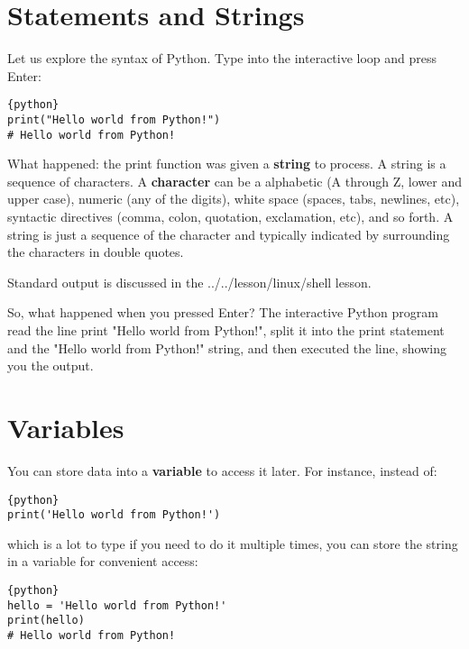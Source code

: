 \FILENAME


\section{Statements and Strings}\label{statements-and-strings}


Let us explore the syntax of Python. Type into the interactive loop and
press Enter:

\begin{lstlisting}{python}
print("Hello world from Python!")
# Hello world from Python! 
\end{lstlisting}

What happened: the print function was given a \textbf{string} to
process. A string is a sequence of characters. A \textbf{character} can
be a alphabetic (A through Z, lower and upper case), numeric (any of the
digits), white space (spaces, tabs, newlines, etc), syntactic directives
(comma, colon, quotation, exclamation, etc), and so forth. A string is
just a sequence of the character and typically indicated by surrounding
the characters in double quotes.

Standard output is discussed in the ../../lesson/linux/shell lesson.

So, what happened when you pressed Enter? The interactive Python program
read the line print "Hello world from Python!", split it into the print
statement and the "Hello world from Python!" string, and then executed
the line, showing you the output.

\section{Variables}\label{variables}

You can store data into a \textbf{variable} to access it later. For
instance, instead of:

\begin{lstlisting}{python}
print('Hello world from Python!')
\end{lstlisting}

which is a lot to type if you need to do it multiple times, you can
store the string in a variable for convenient access:

\begin{lstlisting}{python}
hello = 'Hello world from Python!'
print(hello)
# Hello world from Python!
\end{lstlisting}


